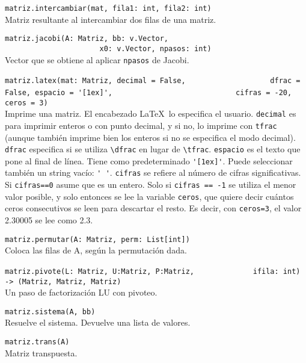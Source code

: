 \documentclass[10pt,landscape]{article}
\begin{document}
\begin{multicols}{3}
\begin{asparaitem}
\item \verb|matriz.intercambiar(mat, fila1: int, fila2: int)| \\
  \quad Matriz resultante al intercambiar dos filas de una matriz.

\item \verb|matriz.jacobi(A: Matriz, bb: v.Vector, |\\
      \verb|                      x0: v.Vector, npasos: int)| \\
      \quad Vector que se obtiene al aplicar \verb|npasos| de Jacobi.

\item \verb|matriz.latex(mat: Matriz, decimal = False,|
  \verb|                   dfrac = False, espacio = '[1ex]',|
  \verb|                            cifras = -20, ceros = 3)| \\
  \quad Imprime una matriz. El encabezado \LaTeX\  lo especifica el usuario. \verb|decimal| es para imprimir enteros o con punto decimal, y si no, lo imprime con \verb|tfrac| (aunque también imprime bien los enteros si no se especifica el modo decimal). \verb|dfrac| especifica si se utiliza \verb|\dfrac| en lugar de \verb|\tfrac|. \verb|espacio| es el texto que pone al final de l\'inea. Tiene como predeterminado \verb|'[1ex]'|. Puede seleccionar tambi\'en un string vac\'io: \verb|' '|. \verb|cifras| se refiere al n\'umero de cifras significativas. Si \verb|cifras==0| asume que es un entero. Solo si \verb|cifras == -1| se utiliza el menor valor posible, y solo entonces se lee la variable \verb|ceros|, que quiere decir cu\'antos ceros consecutivos se leen para descartar el resto. Es decir, con \verb|ceros=3|, el valor 2.30005 se lee como 2.3.

\item \verb|matriz.permutar(A: Matriz, perm: List[int])| \\
\quad Coloca las filas de A, según la permutación dada.

\item \verb|matriz.pivote(L: Matriz, U:Matriz, P:Matriz,|
  \verb|             ifila: int) -> (Matriz, Matriz, Matriz)| \\
  \quad Un paso de factorizaci\'on LU con pivoteo.

\item \verb|matriz.sistema(A, bb)|\\
  \quad Resuelve el sistema. Devuelve una lista de valores.

\item \verb|matriz.trans(A)|\\
  \quad Matriz transpuesta.


\end{asparaitem}
\end{multicols}
\end{document}
